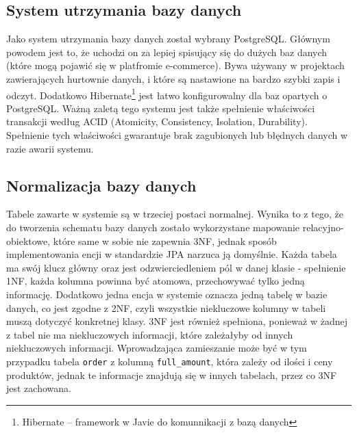 \subsection{System utrzymania bazy danych}
Jako system utrzymania bazy danych został wybrany PostgreSQL. Głównym powodem jest to, że uchodzi on za lepiej spisujący się do dużych baz danych (które mogą pojawić się w platfromie e-commerce). Bywa używany w projektach zawierających hurtownie danych, i które są nastawione na bardzo szybki zapis i odczyt.  Dodatkowo Hibernate\footnote{Hibernate -- framework w Javie do komunnikacji z bazą danych} jest łatwo konfigurowalny dla baz opartych o PostgreSQL. Ważną zaletą tego systemu jest także spełnienie właściwości transakcji według ACID (Atomicity, Consistency, Isolation, Durability). Spełnienie tych właściwości gwarantuje brak zagubionych lub błędnych danych w razie awarii systemu. 

\subsection{Normalizacja bazy danych}
Tabele zawarte w systemie są w trzeciej postaci normalnej. Wynika to z tego, że do tworzenia schematu bazy danych zostało wykorzystane mapowanie relacyjno-obiektowe, które same w sobie nie zapewnia 3NF, jednak sposób implementowania encji w standardzie JPA narzuca ją domyślnie. Każda tabela ma swój klucz główny oraz jest odzwierciedleniem pól w danej klasie - spełnienie 1NF, każda kolumna powinna być atomowa, przechowywać tylko jedną informację. Dodatkowo jedna encja w systemie oznacza jedną tabelę w bazie danych, co jest zgodne z 2NF, czyli wszystkie niekluczowe kolumny w tabeli muszą dotyczyć konkretnej klasy. 3NF jest również spełniona, ponieważ w żadnej z tabel nie ma niekluczowych informacji, które zależałyby od innych niekluczowych informacji. Wprowadzająca zamieszanie może być w tym przypadku tabela \texttt{order} z kolumną \texttt{full\_amount}, która zależy od ilości i ceny produktów, jednak te informacje znajdują się w innych tabelach, przez co 3NF jest zachowana. 
